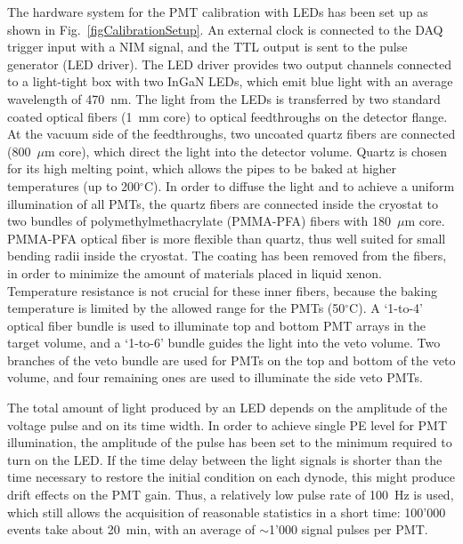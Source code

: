 The hardware system for the PMT calibration with LEDs has been set up as shown in Fig.~\ref{figCalibrationSetup}. An external clock is connected to the DAQ trigger input with a NIM signal, and the TTL output is sent to the pulse generator (LED driver). The LED driver provides two output channels connected to a light-tight box with two InGaN LEDs, which emit blue light  with an average wavelength of 470~nm. The light from the LEDs is transferred by two standard coated optical fibers (1~mm core) to optical feedthroughs on the detector flange. At the vacuum side of the feedthroughs, two uncoated quartz fibers are connected (800~$\mu$m core), which direct the light into the detector volume. Quartz is chosen for its high melting point, which allows  the pipes to be baked at higher temperatures (up to 200$^{\circ}$C). In order to diffuse the light and to achieve a uniform illumination of all PMTs, the quartz fibers are connected inside the cryostat to two bundles of polymethylmethacrylate (PMMA-PFA) fibers with 180~$\mu$m core. PMMA-PFA optical fiber is more flexible than quartz, thus well suited for small bending radii inside the cryostat. The coating has been removed from the fibers, in order to minimize the amount of materials placed in liquid xenon. Temperature resistance is not crucial for these inner fibers, because the baking temperature is limited by the allowed range for the PMTs (50$^{\circ}$C). A `1-to-4' optical fiber bundle is used to illuminate top and bottom PMT arrays in the target volume, and a `1-to-6' bundle guides the light into the veto volume. Two branches of the veto bundle are used for PMTs on the top and bottom of the veto volume, and four remaining ones are used to illuminate the side veto PMTs.


The total amount of light produced by an LED depends on the amplitude of the voltage pulse and on its time width. In order to achieve single PE level for PMT illumination, the amplitude of the pulse has been set to the minimum required to turn on the LED. If the time delay between the light signals is shorter than the time necessary to restore the initial condition on each dynode, this might produce drift effects on the PMT gain. Thus, a relatively low pulse rate of 100~Hz is used, which still allows the acquisition of reasonable statistics in a short time: 100'000 events take about 20~min, with an average of $\sim$1'000 signal pulses per PMT. 

